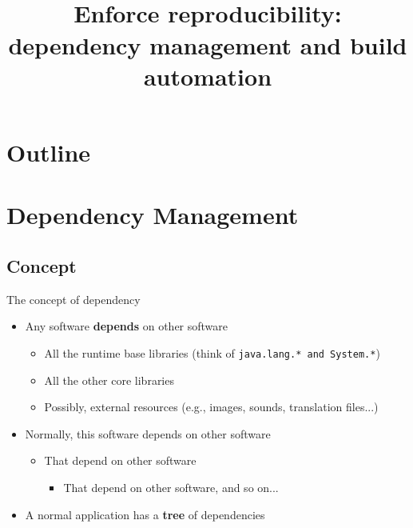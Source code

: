\documentclass[presentation]{beamer}
\title[03 - Dependency Management]{\small{} \\
\normalsize{Enforce reproducibility: dependency management and build automation}}
\begin{document}


\frame[label=coverpage]{\titlepage}

\section*{Outline}

\frame{\tableofcontents}


\section{Dependency Management}

\subsection{Concept}
\begin{frame}[fragile]{The concept of dependency}
  \begin{itemize}
    \item Any software \textbf{depends} on other software
    \begin{itemize}
      \item All the runtime base libraries (think of \texttt{java.lang.* and System.*})
      \item All the other core libraries
      \item Possibly, external resources (e.g., images, sounds, translation files...)
    \end{itemize}
   \item Normally, this software depends on other software
    \begin{itemize}
      \item That depend on other software
		\begin{itemize}
			\item That depend on other software, and so on...
		\end{itemize}
    \end{itemize}
   \item A normal application has a \textbf{tree} of dependencies
  \end{itemize}
\end{frame}
\end{document}
